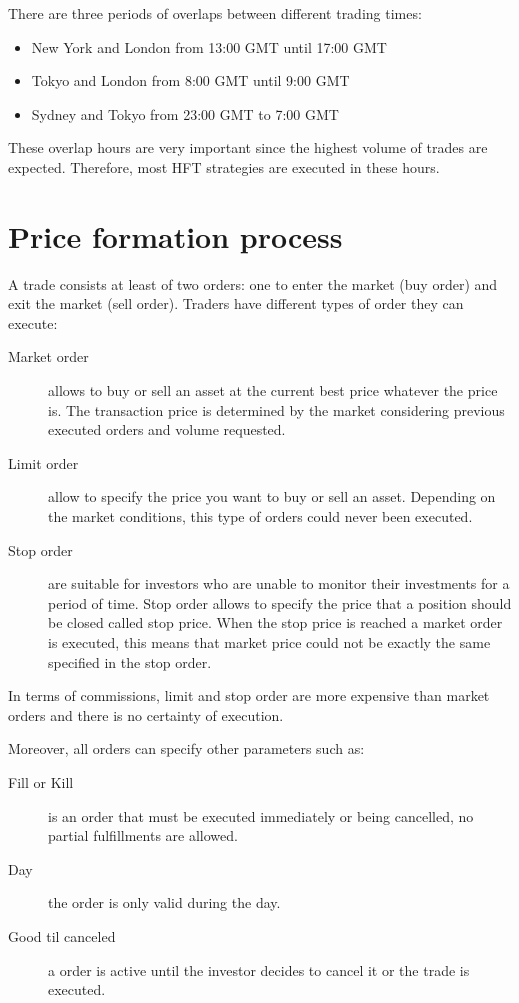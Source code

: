 There are three periods of overlaps between different trading times:

\begin{itemize}
\item New York and London from 13:00 GMT until 17:00 GMT
\item Tokyo and London from 8:00 GMT until 9:00 GMT
\item Sydney and Tokyo from 23:00 GMT to 7:00 GMT 
\end{itemize}

These overlap hours are very important since the highest volume of trades are expected. Therefore, most HFT strategies are executed in these hours.

\section{Price formation process}

A trade consists at least of two orders: one to enter the market (buy order) and
exit the market (sell order). Traders have different types of order they can
execute:

\begin{description}
\item[Market order] allows to buy or sell an asset at the current best price
whatever the price is. The transaction price is determined by the market
considering previous executed orders and volume requested.
\item[Limit order] allow to specify the price you want to buy or sell an asset.
Depending on the market conditions, this type of orders could never been executed.
\item[Stop order] are suitable for investors who are unable to monitor their
investments for a period of time. Stop order allows to specify the price that a
position should be closed called stop price. When the stop price is reached a
market order is executed, this means that market price could not be exactly the same
specified in the stop order.
\end{description}

In terms of commissions, limit and stop order are more expensive than market orders and
there is no certainty of execution.

Moreover, all orders can specify other parameters such as: 

\begin{description}
\item[Fill or Kill] is an order that must be executed immediately or being
cancelled, no partial fulfillments are allowed. 
\item[Day] the order is only valid during the day.
\item[Good til canceled] a order is active until the investor decides to cancel
it or the trade is executed.
\end{description}

